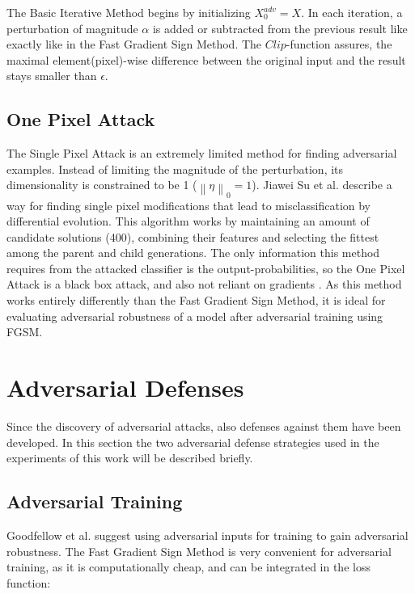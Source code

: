\documentclass[draft,final]{vutinfth} %
\newcommand{\norm}[1]{\left\lVert#1\right\rVert}
\begin{document}
The Basic Iterative Method begins by initializing $X^{adv}_0 = X$.
In each iteration, a perturbation of magnitude $\alpha$ is added or subtracted from the previous result like exactly like in the Fast Gradient Sign Method.
The $Clip$-function assures, the maximal element(pixel)-wise difference between the original input and the result stays smaller than $\epsilon$.

\cite{Kurakin2016}

\subsection{One Pixel Attack}

The Single Pixel Attack is an extremely limited method for finding adversarial examples.
Instead of limiting the magnitude of the perturbation, its dimensionality is constrained to be 1 ($\norm{\eta}_0=1$).
Jiawei Su et al. describe a way for finding single pixel modifications that lead to misclassification by differential evolution.
This algorithm works by maintaining an amount of candidate solutions (400), combining their features and selecting the fittest among the parent and child generations.
The only information this method requires from the attacked classifier is the output-probabilities, so the One Pixel Attack is a black box attack, and also not reliant on gradients \cite{Jiawei2017}.
As this method works entirely differently than the Fast Gradient Sign Method, it is ideal for evaluating adversarial robustness of a model after adversarial training using FGSM.

\section{Adversarial Defenses}

Since the discovery of adversarial attacks, also defenses against them have been developed.
In this section the two adversarial defense strategies used in the experiments of this work will be described briefly.

\subsection{Adversarial Training}

Goodfellow et al. suggest using adversarial inputs for training to gain adversarial robustness.
The Fast Gradient Sign Method is very convenient for adversarial training, as it is computationally cheap, and can be integrated in the loss function:
\end{document}
